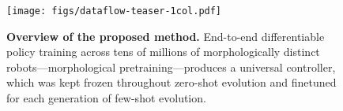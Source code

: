 \begin{figure}[!hb]
    \centering
    \texttt{[image: figs/dataflow-teaser-1col.pdf]}
    \vspace{-16pt}
    \caption{\textbf{Overview of the proposed method.}
    End-to-end differentiable policy training across tens of millions of morphologically distinct robots---morphological pretraining---produces a universal controller, which was kept frozen throughout zero-shot evolution
    and finetuned for each generation of few-shot evolution.
    }
    \vspace{-8pt}
    \label{fig:intro-dataflow}
\end{figure}